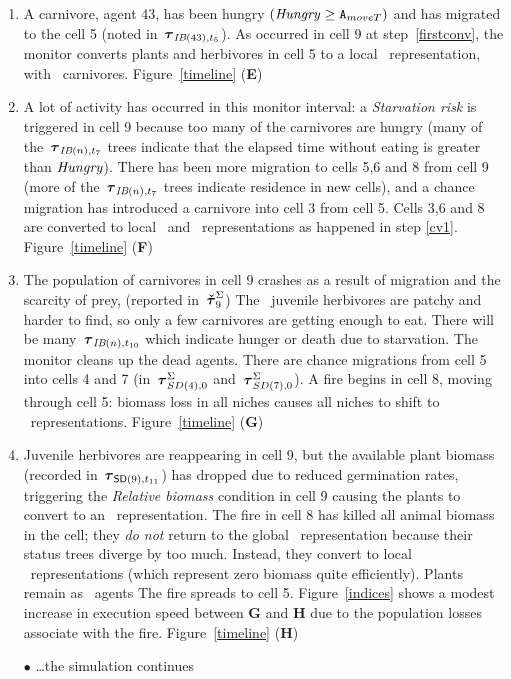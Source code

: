 \begin{enumerate}
\item %
A carnivore, agent 43, has been hungry $(\mathit{Hungry} \ge
\texttt{A}_{moveT})$ and has migrated to the cell 5
(noted in $\,\boldsymbol{\tau}_{\mathsf{\emph{IB}}(43),t_5}$). As occurred in cell 9 at step~\ref{firstconv}, the monitor
converts plants and herbivores in cell 5 to a local
\SD\ rep\-re\-sen\-ta\-tion, with \IB\ carnivores. Figure~\ref{timeline}
(\textbf{E})

\item %
A lot of activity has occurred in this monitor interval: 
a \emph{Starvation risk} is triggered in cell
9 because too many of the carnivores are hungry (many of the
$\,\boldsymbol{\tau}_{\mathsf{\emph{IB}}(n),t_7}$ trees indicate that the elapsed time without eating is
greater than $\mathit{Hungry}$). There has been more migration to
cells 5,6 and 8 from cell 9 (more of the $\,\boldsymbol{\tau}_{\mathsf{\emph{IB}}(n),t_7}$ trees
indicate residence in new cells), and a chance migration has introduced a
carnivore into cell 3 from cell 5. Cells 3,6 and 8 are converted to
local \SD\ and \IB\ rep\-re\-sen\-ta\-tions as happened in step
\ref{cv1}. Figure~\ref{timeline} (\textbf{F})

\item %
The population of carnivores in cell 9 crashes as a result of
migration and the scarcity of prey, (reported in $\,\boldsymbol{\check{\tau}}^\Sigma_{9}$) The
\IB\ juvenile herbivores are patchy and harder to find, so only a few
carnivores are getting enough to eat. There will be many
$\,\boldsymbol{\tau}_{\mathsf{\emph{IB}}(n),t_{10}}$ which indicate hunger or death due to
starvation. The monitor cleans up the dead agents.  There are chance
migrations from cell 5 into cells 4 and 7 (in $\,\boldsymbol{\tau}^\Sigma_{SD(4),0}$ and
$\,\boldsymbol{\tau}^\Sigma_{SD(7),0}$). A fire begins in cell 8, moving through cell 5:
biomass loss in all niches causes all niches to shift to
\IB\ rep\-re\-sen\-ta\-tions. Figure~\ref{timeline} (\textbf{G})

\item %
Juvenile herbivores are reappearing in cell 9, but the available plant
biomass (recorded in $\,\boldsymbol{\tau}_{\mathsf{SD}(9),t_{11}}$) has dropped due to reduced
germination rates, triggering the \emph{Relative biomass} condition in
cell 9 causing the plants to convert to an \IB\ rep\-re\-sen\-ta\-tion.  The
fire in cell 8 has killed all animal biomass in the cell; they
\emph{do not} return to the global \SD\ rep\-re\-sen\-ta\-tion because their
status trees diverge by too much.  Instead, they convert to local
\SD\ rep\-re\-sen\-ta\-tions (which represent zero biomass quite
efficiently). Plants remain as \IB\ agents The fire spreads to cell
5. Figure~\ref{indices} shows a modest increase in execution speed
between \textbf{G} and \textbf{H} due to the population losses
associate with the fire. 
Figure~\ref{timeline} (\textbf{H})

\item[$\bullet$] \ldots the simulation continues
\end{enumerate}


